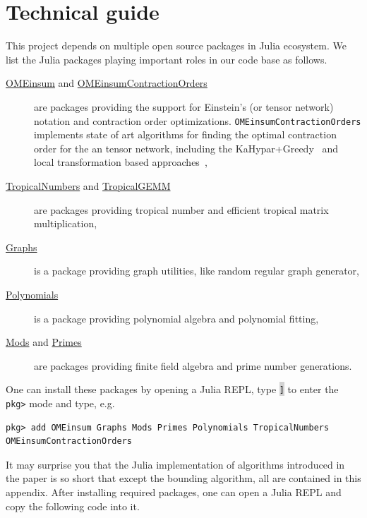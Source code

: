 \documentclass[onefignum, onetabnum]{siamart190516}
\newcommand{\<}{\langle}
\renewcommand{\>}{\rangle}
\begin{document}
\appendix

\section{Technical guide}\label{sec:technical}
This project depends on multiple open source packages in Julia ecosystem.
We list the Julia packages playing important roles in our code base as follows.

\begin{description}
	\item[\href{https://github.com/under-Peter/OMEinsum.jl}{OMEinsum} and \href{https://github.com/Happy-Diode/OMEinsumContractionOrders.jl}{OMEinsumContractionOrders}] are packages providing the support for Einstein's (or tensor network) notation and contraction order optimizations.
    \texttt{OMEinsumContractionOrders} implements state of art algorithms for finding the optimal contraction order for the an tensor network, including the KaHypar+Greedy~\cite{Gray2021, Pan2021} and local transformation based approaches~\cite{Kalachev2021},
	\item[\href{https://github.com/TensorBFS/TropicalNumbers.jl}{TropicalNumbers} and \href{https://github.com/TensorBFS/TropicalGEMM.jl}{TropicalGEMM}] are packages providing tropical number and efficient tropical matrix multiplication,
	\item[\href{https://github.com/JuliaGraphs/Graphs.jl}{Graphs}] is a package providing graph utilities, like random regular graph generator,
	\item[\href{https://github.com/JuliaMath/Polynomials.jl}{Polynomials}] is a package providing polynomial algebra and polynomial fitting,
	\item[\href{https://github.com/scheinerman/Mods.jl}{Mods} and \href{https://github.com/JuliaMath/Primes.jl}{Primes}] are packages providing finite field algebra and prime number generations.
\end{description}

One can install these packages by opening a Julia REPL, type \colorbox{lightgray}{\texttt{]}} to enter the \texttt{pkg>} mode and type, e.g.
\begin{lstlisting}
pkg> add OMEinsum Graphs Mods Primes Polynomials TropicalNumbers OMEinsumContractionOrders
\end{lstlisting}

It may surprise you that the Julia implementation of algorithms introduced in the paper is so short that except the bounding algorithm,
all are contained in this appendix. After installing required packages, one can open a Julia REPL and copy the following code into it.
\end{document}
